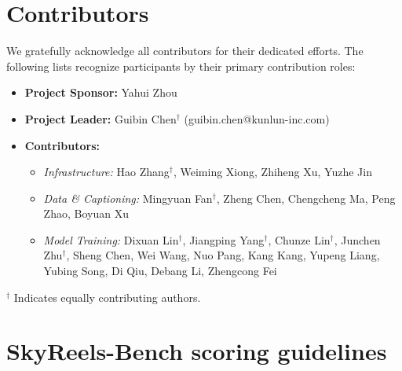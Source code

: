 \documentclass{article}
\begin{document}
\section{Contributors}
We gratefully acknowledge all contributors for their dedicated efforts. The following lists recognize participants by their primary contribution roles:
\begin{itemize}
    \item \textbf{Project Sponsor:} Yahui Zhou

    \item \textbf{Project Leader:} Guibin Chen$^\dagger$ (guibin.chen@kunlun-inc.com)

    \item \textbf{Contributors:}
    \begin{itemize}
        \item \textit{Infrastructure:} Hao Zhang$^\dagger$, Weiming Xiong, Zhiheng Xu, Yuzhe Jin

        \item \textit{Data \& Captioning:} Mingyuan Fan$^\dagger$, Zheng Chen, Chengcheng Ma, Peng Zhao, Boyuan Xu

        \item \textit{Model Training:} Dixuan Lin$^\dagger$, Jiangping Yang$^\dagger$, Chunze Lin$^\dagger$, Junchen Zhu$^\dagger$, Sheng Chen, Wei Wang, Nuo Pang, Kang Kang, Yupeng Liang, Yubing Song, Di Qiu, Debang Li, Zhengcong Fei
    \end{itemize}

\end{itemize}
$^\dagger$ Indicates equally contributing authors.

  


% 


\newpage
\appendix
\setcounter{table}{0} %
\renewcommand{\thetable}{A\arabic{table}} %
\setcounter{algorithm}{0}
\renewcommand{\thealgorithm}{A\arabic{algorithm}}

\section{SkyReels-Bench scoring guidelines}
\label{app:skyreels-bench-detailed}
\end{document}
